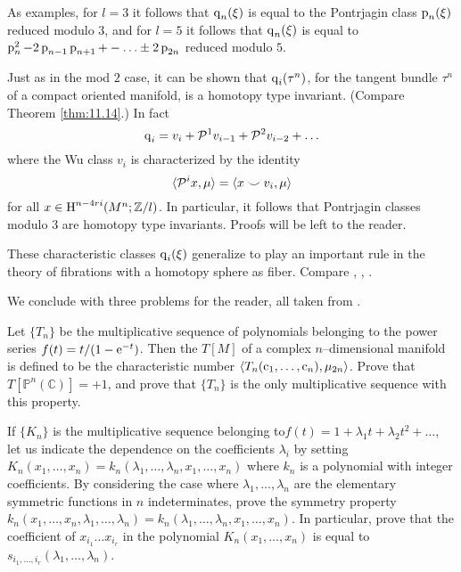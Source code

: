 \documentclass[../main]{subfiles}
\begin{document}
As examples, for $l = 3$ it follows that $\operatorname{q}_n(\xi)$ is equal to the Pontrjagin class $\operatorname{p}_n(\xi)$ reduced modulo $3$, and for $l = 5$ it follows that $\operatorname{q}_n(\xi)$ is equal to $\operatorname{p}_n^2 - 2\operatorname{p}_{n - 1} \operatorname{p}_{n + 1} + - \ldots \pm 2\operatorname{p}_{2n}$ reduced modulo $5$. 

Just as in the mod $2$ case, it can be shown that $\operatorname{q}_i(\tau^n)$, for the tangent bundle $\tau^n$ of a compact oriented manifold, is a homotopy type invariant. (Compare Theorem \ref{thm:11.14}.) In fact \[\operatorname{q}_i = v_i + {\mathcal{P}}^1 v_{i - 1} + {\mathcal{P}}^2 v_{i - 2} + \ldots\] where the Wu class $v_i$ is characterized by the identity \[\langle{\mathcal{P}}^i x,\mu\rangle = \langle x \smile v_i,\mu\rangle\] for all $x \in \operatorname{H}^{n - 4ri}(M^n; {\mathbb Z}/l)$. In particular, it follows that Pontrjagin classes modulo $3$ are homotopy type invariants. Proofs will be left to the reader.

These characteristic classes $\operatorname{q}_i(\xi)$ generalize to play an important rule in the theory of fibrations with a homotopy sphere as fiber. Compare \cite{milnor1968}, \cite{stasheff1968}, \cite{may2006geometry}. 

We conclude with three problems for the reader, all taken from \cite{hirzebruch53}. 

\begin{problem}\label{prob:19.A}
Let $\{T_n\}$ be the multiplicative sequence of polynomials belonging to the power series $f(t) = t/(1 - \operatorname{e}^{-t})$. Then the  $T[M]$ of a complex $n$--dimensional manifold is defined to be the characteristic number $\langle T_n(\operatorname{c}_1, \ldots, \operatorname{c}_n),\mu_{2n}\rangle$. Prove that $T[{\mathbb P}^n(\mathbb C)] = +1$, and prove that $\{T_n\}$ is the only multiplicative sequence with this property. 
\end{problem}

\begin{problem}\label{prob:19.B}
If $\{K_n\}$ is the multiplicative sequence belonging to\newline  $f(t) = 1 + \lambda_1 t + \lambda_2 t^2 + \ldots$, let us indicate the dependence on the coefficients $\lambda_i$ by setting $K_n(x_1, \ldots, x_n) = k_n(\lambda_1, \ldots, \lambda_n, x_1, \ldots, x_n)$ where $k_n$ is a polynomial with integer coefficients. By considering the case where $\lambda_1, \ldots, \lambda_n$ are the elementary symmetric functions in $n$ indeterminates, prove the symmetry property $k_n(x_1, \ldots, x_n, \lambda_1, \ldots, \lambda_n) = k_n(\lambda_1, \ldots, \lambda_n, x_1, \ldots, x_n)$. In particular, prove that the coefficient of $x_{i_1} \ldots x_{i_r}$ in the polynomial $K_n(x_1, \ldots, x_n)$ is equal to $s_{i_1, \ldots, i_r}(\lambda_1, \ldots, \lambda_n)$. 
\end{problem}
\end{document}

